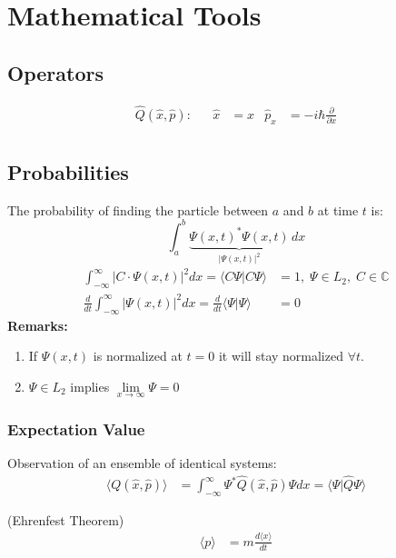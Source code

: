 \section{Mathematical Tools}

\subsection{Operators}
\noindent\begin{align*}
    \hat{Q}(\hat{x},\hat{p}): &  & \widehat{x} & =x & \widehat{p}_x & = -i\hbar \frac{\partial}{\partial x} \\
\end{align*}

\subsection{Probabilities}
The probability of finding the particle between $a$ and $b$ at time $t$ is:
\begin{equation*}
    \int_a^b \underbrace{{\Psi(x,t)}^*\Psi(x,t)}_{|\Psi(x,t)|^2}\,dx
\end{equation*}
\begin{align*}
    \int_{-\infty}^{\infty} |C\cdot \Psi(x,t)|^2 dx                                 = \langle C\Psi|C\Psi\rangle & = 1,\;\Psi\in L_2, \; C\in\mathbb{C} \\
    \frac{d}{dt}\int_{-\infty}^{\infty} |\Psi(x,t)|^2 dx = \frac{d}{dt}\langle\Psi|\Psi\rangle                   & = 0
\end{align*}
\textbf{Remarks:}
\begin{enumerate}
    \item If $\Psi(x,t)$ is normalized at $t=0$ it will stay normalized $\forall t$.
    \item $\Psi \in L_2$ implies $\lim \limits_{x \to \infty}\Psi=0$
\end{enumerate}

\subsubsection{Expectation Value}
Observation of an ensemble of identical systems:
\noindent\begin{align*}
    \langle Q(\hat{x},\hat{p})\rangle & = \int_{-\infty}^{\infty}\Psi^*\hat{Q}(\hat{x},\hat{p})\Psi dx = \langle\Psi|\widehat{Q}\Psi\rangle
\end{align*}

 (Ehrenfest Theorem)
\noindent\begin{align*}
    \langle p \rangle & = m \frac{d\langle x \rangle}{dt}
\end{align*}

